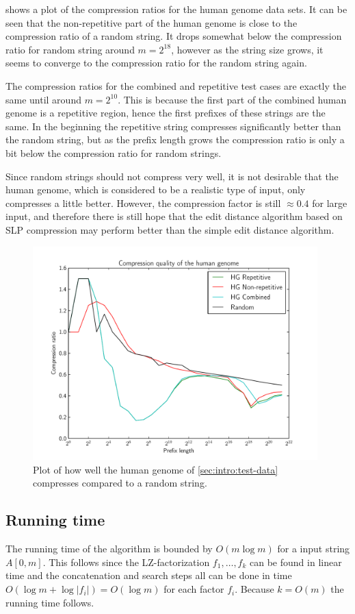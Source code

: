 \documentclass[twoside,11pt,openright]{report}
\newcommand{\str}[3]{#1[#2, #3]}
\begin{document}
 shows a plot of the compression ratios for the human genome data sets. It can be seen that the non-repetitive part of the human genome is close to the compression ratio of a random string. It drops somewhat below the compression ratio for random string around $m = 2^{18}$, however as the string size grows, it seems to converge to the compression ratio for the random string again.

The compression ratios for the combined and repetitive test cases are exactly the same until around $m = 2^{10}$. This is because the first part of the combined human genome is a repetitive region, hence the first prefixes of these strings are the same. In the beginning the repetitive string compresses significantly better than the random string, but as the prefix length grows the compression ratio is only a bit below the compression ratio for random strings.

Since random strings should not compress very well, it is not desirable that the human genome, which is considered to be a realistic type of input, only compresses a little better. However, the compression factor is still $\approx 0.4$ for large input, and therefore there is still hope that the edit distance algorithm based on SLP compression may perform better than the simple edit distance algorithm.

\begin{figure}[h!]
  \centering
  \includegraphics[width=11cm]{compression/hg}
  \caption{Plot of how well the human genome of \cref{sec:intro:test-data} compresses compared to a random string.}
  \label{fig:compression:quality:hg}
\end{figure}

\subsection{Running time}
The running time of the algorithm is bounded by $O(m\log{m})$ for a input string $\str{A}{0}{m}$. This follows since the LZ-factorization $f_1, \dots, f_k$ can be found in linear time and the concatenation and search steps all can be done in time $O(\log{m} + \log{|f_i|}) = O(\log{m})$ for each factor $f_i$. Because $k = O(m)$ the running time follows.
\end{document}
